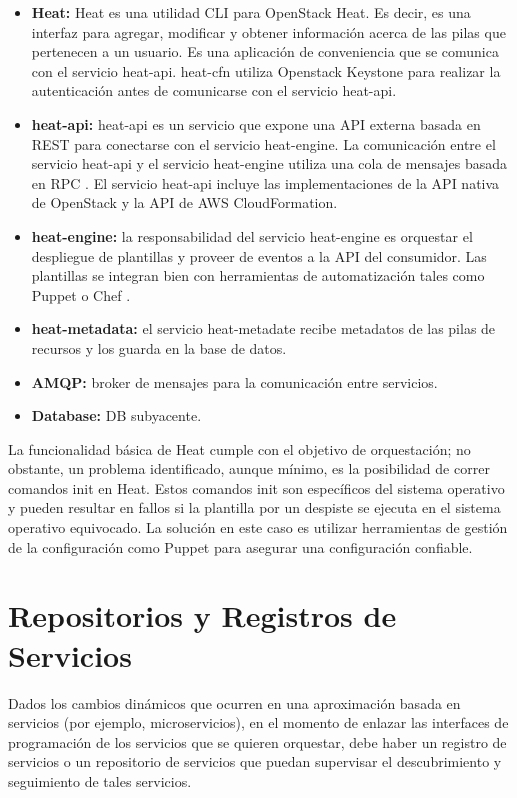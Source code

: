 \begin{itemize}
\item \textbf{Heat:} Heat es una utilidad CLI para OpenStack Heat. Es decir, es una interfaz para agregar, modificar y obtener información acerca de las pilas que pertenecen a un usuario. Es una aplicación de conveniencia que se comunica con el servicio heat-api. heat-cfn utiliza Openstack Keystone para realizar la autenticación antes de comunicarse con el servicio heat-api.
\item \textbf{heat-api:} heat-api es un servicio que expone una API externa basada en REST \cite{Richardson2008-ng} para conectarse con el servicio heat-engine. La comunicación entre el servicio heat-api y el servicio heat-engine utiliza una cola de mensajes basada en RPC \cite{Arpaci-Dusseau2015-px}. El servicio heat-api incluye las implementaciones de la API nativa de OpenStack y la API de AWS CloudFormation.
\item \textbf{heat-engine:} la responsabilidad del servicio heat-engine es orquestar el despliegue de plantillas y proveer de eventos a la API del consumidor. Las plantillas se integran bien con herramientas de automatización tales como Puppet \cite{Puppet2016-ao} o Chef \cite{Chef2016-cc}.
\item \textbf{heat-metadata:} el servicio heat-metadate recibe metadatos de las pilas de recursos y los guarda en la base de datos.
\item \textbf{AMQP:} broker de mensajes para la comunicación entre servicios.
\item \textbf{Database:} DB subyacente.
\end{itemize}

La funcionalidad básica de Heat cumple con el objetivo de orquestación; no obstante, un problema identificado, aunque mínimo, es la posibilidad de correr comandos init en Heat. Estos comandos init son específicos del sistema operativo y pueden resultar en fallos si la plantilla por un despiste se ejecuta en el sistema operativo equivocado. La solución en este caso es utilizar herramientas de gestión de la configuración como Puppet para asegurar una configuración confiable.

\section{Repositorios y Registros de Servicios}
Dados los cambios dinámicos que ocurren en una aproximación basada en servicios (por ejemplo, microservicios), en el momento de enlazar las interfaces de programación de los servicios que se quieren orquestar, debe haber un registro de servicios o un repositorio de servicios que puedan supervisar el descubrimiento y seguimiento de tales servicios.


